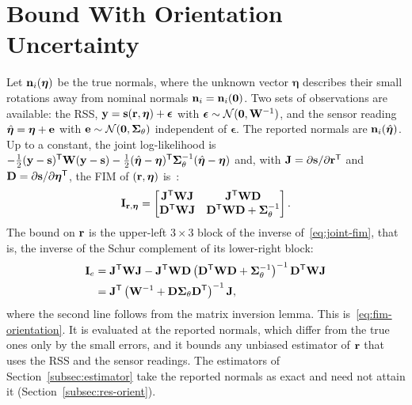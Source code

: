 \section{Bound With Orientation Uncertainty}
\label{app:orientation}
Let $\mathbf{n}_i(\bm\eta)$ be the true normals, where the unknown vector $\bm\eta$ describes their small rotations away from nominal normals $\mathbf{n}_i=\mathbf{n}_i(\mathbf{0})$. Two sets of observations are available: the RSS, $\mathbf{y}=\mathbf{s}(\mathbf{r},\bm\eta)+\bm\epsilon$ with $\bm\epsilon\sim\mathcal N(\mathbf{0},\mathbf{W}^{-1})$, and the sensor reading $\hat{\bm\eta}=\bm\eta+\mathbf{e}$ with $\mathbf{e}\sim\mathcal N(\mathbf{0},\bm\Sigma_\theta)$ independent of $\bm\epsilon$. The reported normals are $\mathbf{n}_i(\hat{\bm\eta})$. Up to a constant, the joint log-likelihood is $-\frac12(\mathbf{y}-\mathbf{s})^{\mathsf T}\mathbf{W}(\mathbf{y}-\mathbf{s})-\frac12(\hat{\bm\eta}-\bm\eta)^{\mathsf T}\bm\Sigma_\theta^{-1}(\hat{\bm\eta}-\bm\eta)$ and, with $\mathbf{J}=\partial\mathbf{s}/\partial\mathbf{r}^{\mathsf T}$ and $\mathbf{D}=\partial\mathbf{s}/\partial\bm\eta^{\mathsf T}$, the FIM of $(\mathbf{r},\bm\eta)$ is~\cite{Kay1993}:
\begin{equation}
 {\mathbf{I}_{\mathbf{r},\bm\eta}=\begin{bmatrix}
  \mathbf{J}^{\mathsf T}\mathbf{W}\mathbf{J} & \mathbf{J}^{\mathsf T}\mathbf{W}\mathbf{D}\\
  \mathbf{D}^{\mathsf T}\mathbf{W}\mathbf{J} & \mathbf{D}^{\mathsf T}\mathbf{W}\mathbf{D}+\bm\Sigma_\theta^{-1}
 \end{bmatrix}.}
 \label{eq:joint-fim}
\end{equation}
The bound on $\mathbf{r}$ is the upper-left $3\times3$ block of the inverse of~\eqref{eq:joint-fim}, that is, the inverse of the Schur complement of its lower-right block:
\begin{equation}
 {\begin{aligned}
  \mathbf{I}_e&=\mathbf{J}^{\mathsf T}\mathbf{W}\mathbf{J}-\mathbf{J}^{\mathsf T}\mathbf{W}\mathbf{D}\left(\mathbf{D}^{\mathsf T}\mathbf{W}\mathbf{D}+\bm\Sigma_\theta^{-1}\right)^{-1}\mathbf{D}^{\mathsf T}\mathbf{W}\mathbf{J}\\
  &=\mathbf{J}^{\mathsf T}\left(\mathbf{W}^{-1}+\mathbf{D}\bm\Sigma_\theta\mathbf{D}^{\mathsf T}\right)^{-1}\mathbf{J},
 \end{aligned}}
 \label{eq:schur}
\end{equation}
where the second line follows from the matrix inversion lemma. This is~\eqref{eq:fim-orientation}. It is evaluated at the reported normals, which differ from the true ones only by the small errors, and it bounds any unbiased estimator of $\mathbf{r}$ that uses the RSS and the sensor readings. The estimators of Section~\ref{subsec:estimator} take the reported normals as exact and need not attain it (Section~\ref{subsec:res-orient}).

